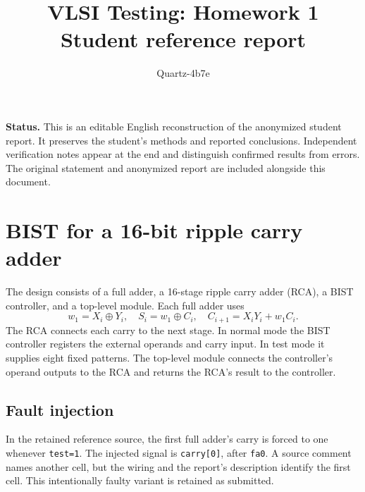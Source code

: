 \documentclass[11pt,a4paper]{article}
\title{VLSI Testing: Homework 1\\Student reference report}
\author{Quartz-4b7e}\date{}
\begin{document}
\maketitle
\textbf{Status.} This is an editable English reconstruction of the anonymized student report. It preserves the student's methods and reported conclusions. Independent verification notes appear at the end and distinguish confirmed results from errors. The original statement and anonymized report are included alongside this document.

\section{BIST for a 16-bit ripple carry adder}
The design consists of a full adder, a 16-stage ripple carry adder (RCA), a BIST controller, and a top-level module. Each full adder uses
\[
w_1=X_i\oplus Y_i,\quad S_i=w_1\oplus C_i,\quad
C_{i+1}=X_iY_i+w_1C_i.
\]
The RCA connects each carry to the next stage. In normal mode the BIST controller registers the external operands and carry input. In test mode it supplies eight fixed patterns. The top-level module connects the controller's operand outputs to the RCA and returns the RCA's result to the controller.

\begin{center}
\end{center}

\subsection{Fault injection}
In the retained reference source, the first full adder's carry is forced to one whenever \texttt{test=1}. The injected signal is \texttt{carry[0]}, after \texttt{fa0}. A source comment names another cell, but the wiring and the report's description identify the first cell. This intentionally faulty variant is retained as submitted.
\end{document}
